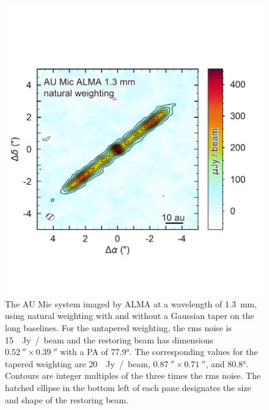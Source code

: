 \documentclass[modern]{aastex62}
\begin{document}
\begin{figure}
    \centering
    \includegraphics[width=0.8\linewidth]{../figures/aumic_imaged}
    \caption{The AU Mic system imaged by ALMA at a wavelength of \SI{1.3}{mm}, using natural weighting with and without a Gaussian taper on the long baselines. 
    For the untapered weighting, the rms noise is \SI{15}{\mu Jy / beam} and the restoring beam has dimensions $\SI{0.52}{\arcsecond} \times \SI{0.39}{\arcsecond}$ with a PA of \ang[angle-symbol-over-decimal]{77.9}.
    The corresponding values for the tapered weighting are \SI{20}{\mu Jy / beam}, $\SI{0.87}{\arcsecond} \times \SI{0.71}{\arcsecond}$, and \ang[angle-symbol-over-decimal]{80.8}. 
    Contours are integer multiples of the three times the rms noise.
    The hatched ellipse in the bottom left of each pane designates the size and shape of the restoring beam.
    }
    \label{fig: aumic_imaged}
\end{figure}
\end{document}
